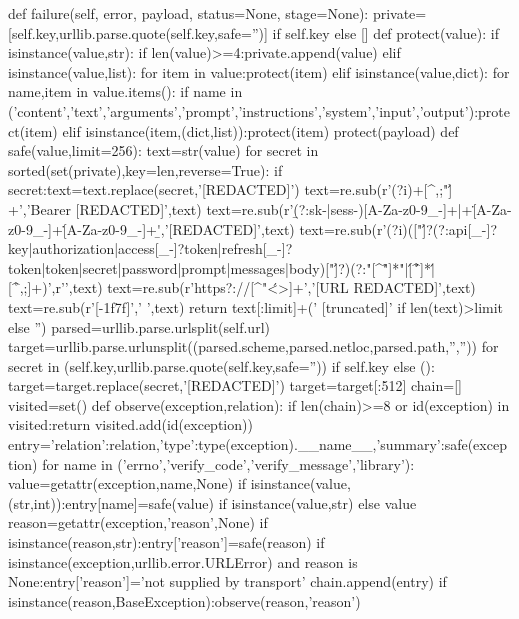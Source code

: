 {    def failure(self, error, payload, status=None, stage=None):
        private=[self.key,urllib.parse.quote(self.key,safe='')] if self.key else []
        def protect(value):
            if isinstance(value,str):
                if len(value)>=4:private.append(value)
            elif isinstance(value,list):
                for item in value:protect(item)
            elif isinstance(value,dict):
                for name,item in value.items():
                    if name in ('content','text','arguments','prompt','instructions','system','input','output'):protect(item)
                    elif isinstance(item,(dict,list)):protect(item)
        protect(payload)
        def safe(value,limit=256):
            text=str(value)
            for secret in sorted(set(private),key=len,reverse=True):
                if secret:text=text.replace(secret,'[REDACTED]')
            text=re.sub(r'(?i)\bBearer\s+[^\s,;"\']+','Bearer [REDACTED]',text)
            text=re.sub(r'\b(?:sk-|sess-)[A-Za-z0-9_-]+|\beyJ[A-Za-z0-9_-]+\.[A-Za-z0-9_-]+\.[A-Za-z0-9_-]+\b','[REDACTED]',text)
            text=re.sub(r'(?i)(["\']?(?:api[_-]?key|authorization|access[_-]?token|refresh[_-]?token|token|secret|password|prompt|messages|body)["\']?\s*[:=]\s*)(?:"[^"\r\n]*"|\'[^\'\r\n]*\'|[^\r\n,;]+)',r'\1[REDACTED]',text)
            text=re.sub(r'https?://[^\s"\'<>]+','[URL REDACTED]',text)
            text=re.sub(r'[-\x1f\x7f]',' ',text)
            return text[:limit]+(' [truncated]' if len(text)>limit else '')
        parsed=urllib.parse.urlsplit(self.url)
        target=urllib.parse.urlunsplit((parsed.scheme,parsed.netloc,parsed.path,'',''))
        for secret in (self.key,urllib.parse.quote(self.key,safe='')) if self.key else ():
            target=target.replace(secret,'[REDACTED]')
        target=target[:512]
        chain=[]
        visited=set()
        def observe(exception,relation):
            if len(chain)>=8 or id(exception) in visited:return
            visited.add(id(exception))
            entry={'relation':relation,'type':type(exception).__name__,'summary':safe(exception)}
            for name in ('errno','verify_code','verify_message','library'):
                value=getattr(exception,name,None)
                if isinstance(value,(str,int)):entry[name]=safe(value) if isinstance(value,str) else value
            reason=getattr(exception,'reason',None)
            if isinstance(reason,str):entry['reason']=safe(reason)
            if isinstance(exception,urllib.error.URLError) and reason is None:entry['reason']='not supplied by transport'
            chain.append(entry)
            if isinstance(reason,BaseException):observe(reason,'reason')
}
